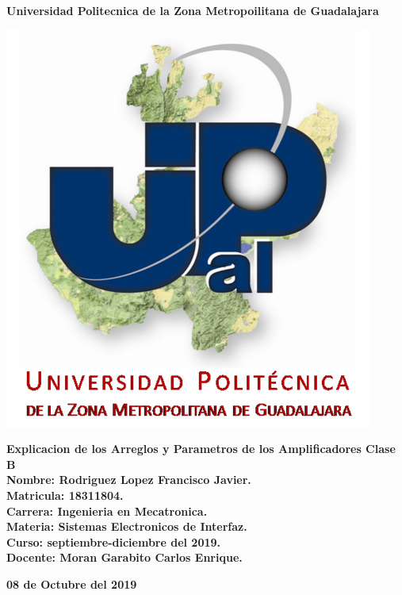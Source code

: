 \documentclass[12pt,a4paper]{article}
\author{Rodriguez Lopez Francisco Javier}
\begin{document}
\begin{center}
\LARGE \textbf{Universidad Politecnica de la Zona Metropoilitana de Guadalajara\\}


\includegraphics[scale=1]{Upzmg4.png} 

\large \textbf{Explicacion de los Arreglos y Parametros de los Amplificadores Clase B}\\
\vspace{2cm}
\large \textbf{Nombre: Rodriguez Lopez Francisco Javier.\\
\vspace{0.5cm} Matricula: 18311804.\\
\vspace{0.5cm} Carrera: Ingenieria en Mecatronica.\\
\vspace{0.5cm} Materia: Sistemas Electronicos de Interfaz.\\
\vspace{0.5cm} Curso: septiembre-diciembre del 2019.\\
\vspace{0.5cm} Docente: Moran Garabito Carlos Enrique.}


\vspace{6cm}
\small \textbf{08 de Octubre del 2019}
\end{center}
\end{document}

